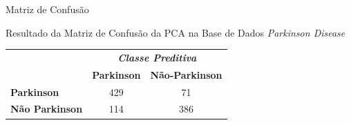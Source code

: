 \documentclass{beamer}
\begin{document}
\begin{frame}{Matriz de Confusão}
	\begin{block}{Resultado da Matriz de Confusão da PCA na Base de Dados \textit{Parkinson Disease}}
\begin{table}[!htbp]
\label{table:resultadomatrizconfusaopca}
\centering
\begin{tabular}{l|c|c|}
\cline{2-3}
\multicolumn{1}{c}{}                         & \multicolumn{2}{|c|}{\textit{\textbf{Classe Preditiva}}} \\ \cline{2-3} 
                                             & \textbf{Parkinson}      & \textbf{Não-Parkinson}         \\ \hline
\multicolumn{1}{|l|}{\textbf{Parkinson}} & 429       & 71           \\ \hline
\multicolumn{1}{|l|}{\textbf{Não Parkinson}}     & 114           & 386     \\ \hline
\end{tabular}
\end{table}
	\end{block}
\end{frame}
\end{document}

